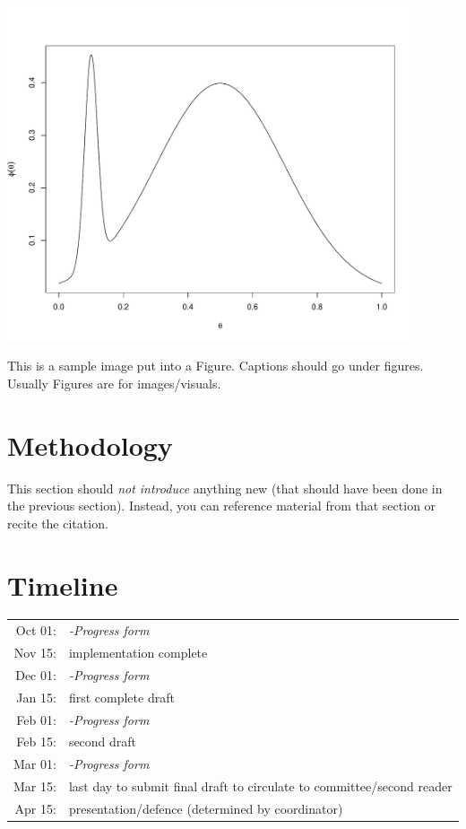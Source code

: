 \documentclass[12pt]{article}
\begin{document}
\begin{table}
	\begin{tab}
		\includegraphics[width=0.9\textwidth]{Rplot}
		\caption{\label{fig:sampleimage1} This is a sample image put into a Figure. Captions should go under figures. Usually Figures are for images/visuals.}
	\end{tab}
\end{table}


	\section{Methodology}
	This section should \emph{not introduce} anything new (that should have been done in the previous section). Instead, you can reference material from that section or recite the citation. 
	\section{Timeline}
	\begin{tabular}{r p{}}
		Oct 01:& \emph{-Progress form}\\
		Nov 15:& implementation complete\\
		Dec 01:& \emph{-Progress form}\\
		Jan 15:& first complete draft\\
		Feb 01:& \emph{-Progress form}\\
		Feb 15:& second draft\\
		Mar 01:& \emph{-Progress form}\\
		Mar 15:& last day to submit final draft to circulate to committee/second reader\\
		Apr 15:& presentation/defence (determined by coordinator)\\
	\end{tabular}
\end{document}
